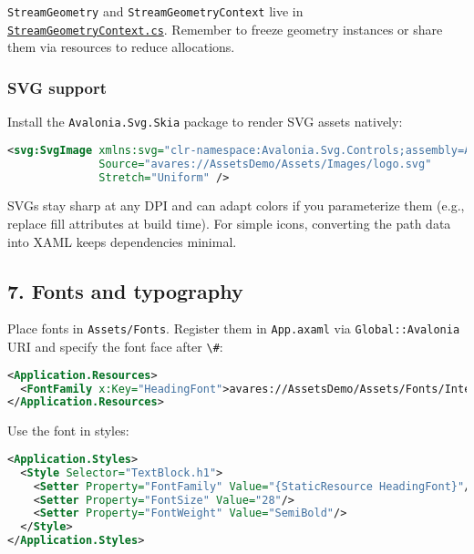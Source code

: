 \passthrough{\lstinline!StreamGeometry!} and
\passthrough{\lstinline!StreamGeometryContext!} live in
\href{https://github.com/AvaloniaUI/Avalonia/blob/master/src/Avalonia.Base/Media/StreamGeometryContext.cs}{\passthrough{\lstinline!StreamGeometryContext.cs!}}.
Remember to freeze geometry instances or share them via resources to
reduce allocations.

\subsubsection{SVG support}\label{svg-support}

Install the \passthrough{\lstinline!Avalonia.Svg.Skia!} package to
render SVG assets natively:

\begin{lstlisting}[language=XML]
<svg:SvgImage xmlns:svg="clr-namespace:Avalonia.Svg.Controls;assembly=Avalonia.Svg.Skia"
              Source="avares://AssetsDemo/Assets/Images/logo.svg"
              Stretch="Uniform" />
\end{lstlisting}

SVGs stay sharp at any DPI and can adapt colors if you parameterize them
(e.g., replace fill attributes at build time). For simple icons,
converting the path data into XAML keeps dependencies minimal.

\subsection{7. Fonts and typography}\label{fonts-and-typography}

Place fonts in \passthrough{\lstinline!Assets/Fonts!}. Register them in
\passthrough{\lstinline!App.axaml!} via
\passthrough{\lstinline!Global::Avalonia!} URI and specify the font face
after \passthrough{\lstinline!\#!}:

\begin{lstlisting}[language=XML]
<Application.Resources>
  <FontFamily x:Key="HeadingFont">avares://AssetsDemo/Assets/Fonts/Inter.ttf#Inter</FontFamily>
</Application.Resources>
\end{lstlisting}

Use the font in styles:

\begin{lstlisting}[language=XML]
<Application.Styles>
  <Style Selector="TextBlock.h1">
    <Setter Property="FontFamily" Value="{StaticResource HeadingFont}"/>
    <Setter Property="FontSize" Value="28"/>
    <Setter Property="FontWeight" Value="SemiBold"/>
  </Style>
</Application.Styles>
\end{lstlisting}


